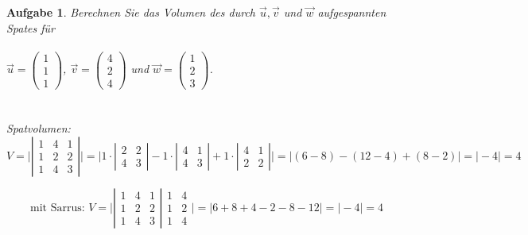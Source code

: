 \documentclass[12pt]{article}
\newtheorem{exercise}[satz]{Aufgabe}
\begin{document}
\begin{exercise}
  Berechnen Sie das Volumen des durch $\vec{u}, \vec{v}$ und $\vec{w}$ aufgespannten Spates f\"ur \, \\ \\
  $\vec{u}=\left(\begin{array}{r} 1 \\ 1 \\ 1 \end{array}\right)$,
  $\vec{v}=\left(\begin{array}{r} 4 \\ 2 \\ 4 \end{array}\right)$ und
  $\vec{w}=\left(\begin{array}{r} 1 \\ 2 \\ 3 \end{array}\right)$.\\ \\ \\

  Spatvolumen:
  \[ V=\vert \left| \begin{array}{ccc}
  1 & 4 & 1 \\
  1 & 2 & 2 \\
  1 & 4 & 3 \end{array} \right|\vert
  = \vert 1\cdot \left| \begin{array}{cc} 2 & 2 \\ 4 & 3 \end{array} \right|
        - 1\cdot \left| \begin{array}{cc} 4 & 1 \\ 4 & 3 \end{array} \right|
        + 1\cdot \left| \begin{array}{cc} 4 & 1 \\ 2 & 2 \end{array} \right|
    \vert
  = \vert (6-8) - (12-4) + (8-2) \vert = \vert -4 \vert = 4
  \]  



  \[ \textrm{mit Sarrus:}\,\, V=\vert \left| \begin{array}{ccc}
  1 & 4 & 1 \\
  1 & 2 & 2 \\
  1 & 4 & 3 \end{array} \right|
  \begin{array}{cc}
  1 & 4 \\
  1 & 2 \\
  1 & 4 \end{array}
  \vert
  = \vert 6+8+4-2-8-12 \vert = \vert -4 \vert = 4
  \]  

\end{exercise}
\end{document}
